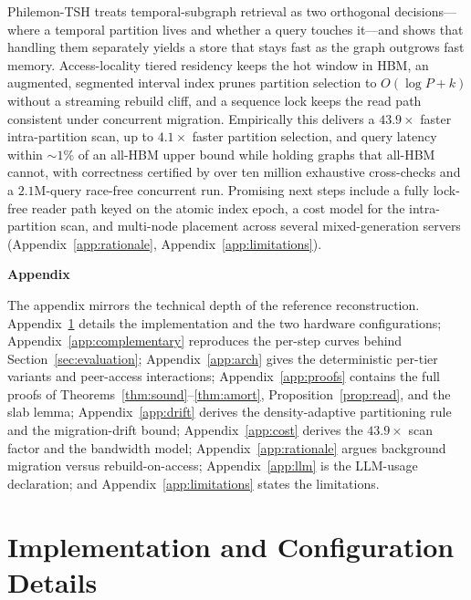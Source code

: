 \documentclass[10pt]{article}
\theoremstyle{definition}
\begin{document}
Philemon-TSH treats temporal-subgraph retrieval as two orthogonal decisions---where a
temporal partition lives and whether a query touches it---and shows that handling them
separately yields a store that stays fast as the graph outgrows fast memory.
Access-locality tiered residency keeps the hot window in HBM, an augmented, segmented
interval index prunes partition selection to $O(\log P + k)$ without a streaming
rebuild cliff, and a sequence lock keeps the read path consistent under concurrent
migration. Empirically this delivers a $43.9\times$ faster intra-partition scan, up to
$4.1\times$ faster partition selection, and query latency within ${\sim}1\%$ of an
all-HBM upper bound while holding graphs that all-HBM cannot, with correctness
certified by over ten million exhaustive cross-checks and a $2.1$M-query race-free
concurrent run. Promising next steps include a fully lock-free reader path keyed on the
atomic index epoch, a cost model for the intra-partition scan, and multi-node placement
across several mixed-generation servers (Appendix~\ref{app:rationale},
Appendix~\ref{app:limitations}).




\newpage
\appendix
\begin{center}\Large\textbf{Appendix}\end{center}
\noindent The appendix mirrors the technical depth of the reference reconstruction.
Appendix~\ref{app:config} details the implementation and the two hardware
configurations; Appendix~\ref{app:complementary} reproduces the per-step curves
behind Section~\ref{sec:evaluation}; Appendix~\ref{app:arch} gives the deterministic
per-tier variants and peer-access interactions; Appendix~\ref{app:proofs} contains
the full proofs of Theorems~\ref{thm:sound}--\ref{thm:amort},
Proposition~\ref{prop:read}, and the slab lemma; Appendix~\ref{app:drift} derives the
density-adaptive partitioning rule and the migration-drift bound;
Appendix~\ref{app:cost} derives the $43.9\times$ scan factor and the bandwidth model;
Appendix~\ref{app:rationale} argues background migration versus rebuild-on-access;
Appendix~\ref{app:llm} is the LLM-usage declaration; and
Appendix~\ref{app:limitations} states the limitations.

\section{Implementation and Configuration Details}
\label{app:config}
\end{document}
